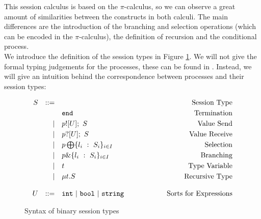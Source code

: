 \documentclass[12pt,twoside]{report}
\newcommand{\comment}[1]{}
\newcommand{\white}{\ \ \ \ \ \ \ \ \ \ \ \ }
\begin{document}
This session calculus is based on the $\pi$-calculus, so we can observe a great amount of similarities between the constructs in both calculi. The main differences are the introduction of the branching and selection operations (which can be encoded in the $\pi$-calculus), the definition of recursion and the conditional process. \\


We introduce the definition of the session types in Figure \ref{bst_session_types}. We will not give the formal typing judgements for the processes, these can be found in \cite{co406, binarysessiontypes1, subtyping}\comment{Course material ref and possibly language primitives}. Instead, we will give an intuition behind the correspondence between processes and their session types:

\begin{figure}[h]
    \centering
    \begin{equation*}
    \centering
    \begin{array}{rrlcr}
        S & ::= && \white & \text{Session\ Type} \\[2.75pt]
             &   & \texttt{end} & \white & \text{Termination}  \\[2.75pt]
             & | & p![U];\ S & \white & \text{Value\ Send} \\[2.75pt]
             & | & p?[U];\ S & \white & \text{Value\ Receive} \\[2.75pt]
             & | & p \bigoplus \{l_i\ :\ S_i\}_{i \in I} & \white& \text{Selection} \\[2.75pt]
             & | & p \& \{l_i\ :\ S_i\}_{i \in I} & \white & \text{Branching} \\[2.75pt] 
             & | & t & \white & \text{Type\ Variable} \\[2.75pt]
             & | & \mu t.S & \white & \text{Recursive\ Type}\\\\
        U & ::= & \texttt{int}\ |\ \texttt{bool}\ |\ \texttt{string}& \white & \text{Sorts\ for\ Expressions}
        \end{array}
    \end{equation*}
    \caption{Syntax of binary session types}
    \label{bst_session_types}
\end{figure}{}
\end{document}
